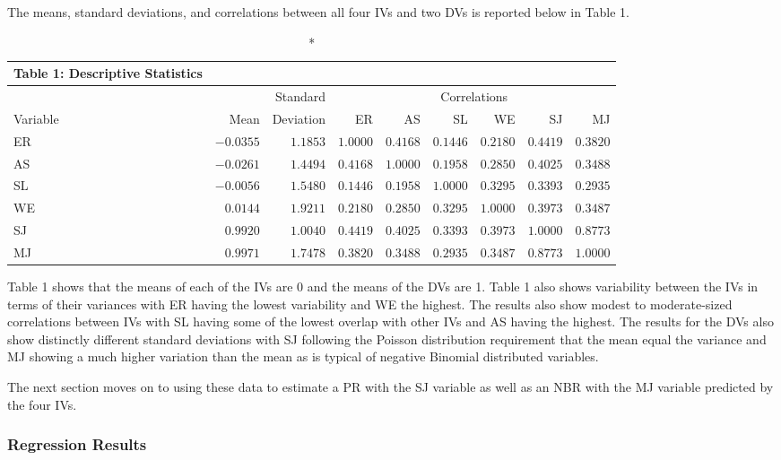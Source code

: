 \documentclass[ShortAfour,times,sageapa]{sagej}
\begin{document}
	The means, standard deviations, and correlations between all four IVs and two DVs is reported below in Table 1. 
	
\begin{longtable}{lrr|rrrrrr}
	\caption*{
		{\large Table 1: Descriptive Statistics}
	} \\ 
	\toprule
	&  & Standard & \multicolumn{6}{c}{Correlations} \\ 
	\cmidrule(lr){4-9}
	Variable & Mean & Deviation & ER & AS & SL & WE & SJ & MJ \\ 
	\midrule
	ER & $-0.0355$ & $1.1853$ & $1.0000$ & $0.4168$ & $0.1446$ & $0.2180$ & $0.4419$ & $0.3820$ \\ 
	AS & $-0.0261$ & $1.4494$ & $0.4168$ & $1.0000$ & $0.1958$ & $0.2850$ & $0.4025$ & $0.3488$ \\ 
	SL & $-0.0056$ & $1.5480$ & $0.1446$ & $0.1958$ & $1.0000$ & $0.3295$ & $0.3393$ & $0.2935$ \\ 
	WE & $0.0144$ & $1.9211$ & $0.2180$ & $0.2850$ & $0.3295$ & $1.0000$ & $0.3973$ & $0.3487$ \\ 
	SJ & $0.9920$ & $1.0040$ & $0.4419$ & $0.4025$ & $0.3393$ & $0.3973$ & $1.0000$ & $0.8773$ \\ 
	MJ & $0.9971$ & $1.7478$ & $0.3820$ & $0.3488$ & $0.2935$ & $0.3487$ & $0.8773$ & $1.0000$ \\ 
	\bottomrule
\end{longtable}

	Table 1 shows that the means of each of the IVs are 0 and the means of the DVs are 1. 
	Table 1 also shows variability between the IVs in terms of their variances with ER having the lowest variability and WE the highest.
	The results also show modest to moderate-sized correlations between IVs with SL having some of the lowest overlap with other IVs and AS having the highest.
	The results for the DVs also show distinctly different standard deviations with SJ following the Poisson distribution requirement that the mean equal the variance and MJ showing a much higher variation than the mean as is typical of negative Binomial distributed variables.
	
	The next section moves on to using these data to estimate a PR with the SJ variable as well as an NBR with the MJ variable predicted by the four IVs.

		\subsubsection{Regression Results}
		
\end{document}
